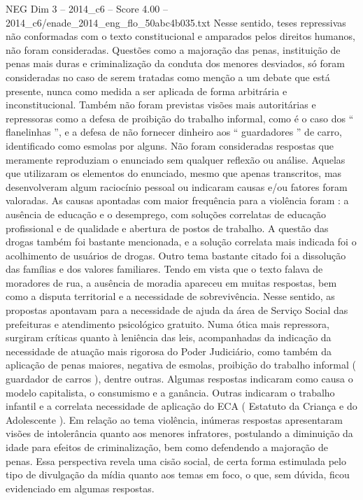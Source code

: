 \begin{textsample}{NEG Dim 3 – 2014\_c6 – Score 4.00 – 2014\_c6/enade\_2014\_eng\_flo\_50abc4b035.txt}
Nesse sentido, teses repressivas não conformadas com o texto constitucional e amparados pelos direitos humanos, não foram consideradas.
Questões como a majoração das penas, instituição de penas mais duras e criminalização da conduta dos menores desviados, só foram consideradas no caso de serem tratadas como menção a um debate que está presente, nunca como medida a ser aplicada de forma arbitrária e inconstitucional.
Também não foram previstas visões mais autoritárias e repressoras como a defesa de proibição do trabalho informal, como é o caso dos “ flanelinhas ”, e a defesa de não fornecer dinheiro aos “ guardadores ” de carro, identificado como esmolas por alguns.
Não foram consideradas respostas que meramente reproduziam o enunciado sem qualquer reflexão ou análise.
Aquelas que utilizaram os elementos do enunciado, mesmo que apenas transcritos, mas desenvolveram algum raciocínio pessoal ou indicaram causas e/ou fatores foram valoradas.
As causas apontadas com maior frequência para a violência foram : a ausência de educação e o desemprego, com soluções correlatas de educação profissional e de qualidade e abertura de postos de trabalho.
A questão das drogas também foi bastante mencionada, e a solução correlata mais indicada foi o acolhimento de usuários de drogas.
Outro tema bastante citado foi a dissolução das famílias e dos valores familiares.
Tendo em vista que o texto falava de moradores de rua, a ausência de moradia apareceu em muitas respostas, bem como a disputa territorial e a necessidade de sobrevivência.
Nesse sentido, as propostas apontavam para a necessidade de ajuda da área de Serviço Social das prefeituras e atendimento psicológico gratuito.
Numa ótica mais repressora, surgiram críticas quanto à leniência das leis, acompanhadas da indicação da necessidade de atuação mais rigorosa do Poder Judiciário, como também da aplicação de penas maiores, negativa de esmolas, proibição do trabalho informal ( guardador de carros ), dentre outras.
Algumas respostas indicaram como causa o modelo capitalista, o consumismo e a ganância.
Outras indicaram o trabalho infantil e a correlata necessidade de aplicação do ECA ( Estatuto da Criança e do Adolescente ).
Em relação ao tema violência, inúmeras respostas apresentaram visões de intolerância quanto aos menores infratores, postulando a diminuição da idade para efeitos de criminalização, bem como defendendo a majoração de penas.
Essa perspectiva revela uma cisão social, de certa forma estimulada pelo tipo de divulgação da mídia quanto aos temas em foco, o que, sem dúvida, ficou evidenciado em algumas respostas.

\end{textsample}
